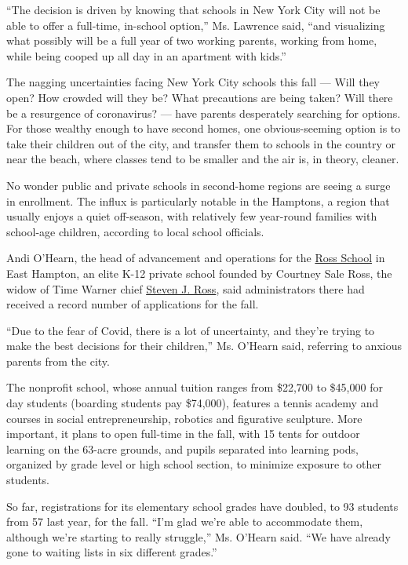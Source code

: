 ``The decision is driven by knowing that schools in New York City will
not be able to offer a full-time, in-school option,'' Ms. Lawrence said,
``and visualizing what possibly will be a full year of two working
parents, working from home, while being cooped up all day in an
apartment with kids.''

The nagging uncertainties facing New York City schools this fall ---
Will they open? How crowded will they be? What precautions are being
taken? Will there be a resurgence of coronavirus? --- have parents
desperately searching for options. For those wealthy enough to have
second homes, one obvious-seeming option is to take their children out
of the city, and transfer them to schools in the country or near the
beach, where classes tend to be smaller and the air is, in theory,
cleaner.

No wonder public and private schools in second-home regions are seeing a
surge in enrollment. The influx is particularly notable in the Hamptons,
a region that usually enjoys a quiet off-season, with relatively few
year-round families with school-age children, according to local school
officials.

Andi O'Hearn, the head of advancement and operations for the
\href{https://www.ross.org/}{Ross School} in East Hampton, an elite K-12
private school founded by Courtney Sale Ross, the widow of Time Warner
chief
\href{https://www.nytimes.com/1992/12/21/obituaries/the-creator-of-time-warner-steven-j-ross-is-dead-at-65.html}{Steven
J. Ross}, said administrators there had received a record number of
applications for the fall.

``Due to the fear of Covid, there is a lot of uncertainty, and they're
trying to make the best decisions for their children,'' Ms. O'Hearn
said, referring to anxious parents from the city.

The nonprofit school, whose annual tuition ranges from \$22,700 to
\$45,000 for day students (boarding students pay \$74,000), features a
tennis academy and courses in social entrepreneurship, robotics and
figurative sculpture. More important, it plans to open full-time in the
fall, with 15 tents for outdoor learning on the 63-acre grounds, and
pupils separated into learning pods, organized by grade level or high
school section, to minimize exposure to other students.

So far, registrations for its elementary school grades have doubled, to
93 students from 57 last year, for the fall. ``I'm glad we're able to
accommodate them, although we're starting to really struggle,'' Ms.
O'Hearn said. ``We have already gone to waiting lists in six different
grades.''


